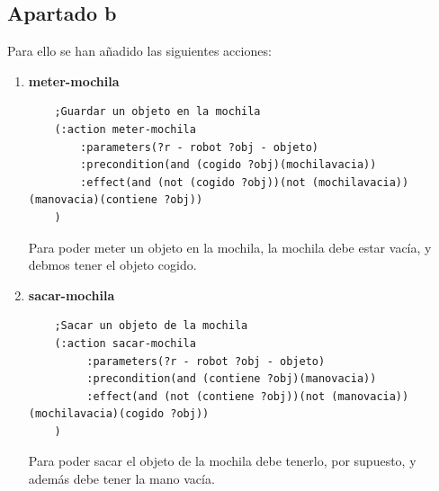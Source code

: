 \subsection{Apartado b}
Para ello se han añadido las siguientes acciones:
\begin{enumerate}
	\item \textbf{meter-mochila}
	\begin{verbatim}
	;Guardar un objeto en la mochila
	(:action meter-mochila
	    :parameters(?r - robot ?obj - objeto)
	    :precondition(and (cogido ?obj)(mochilavacia))
	    :effect(and (not (cogido ?obj))(not (mochilavacia))(manovacia)(contiene ?obj))
	)
	\end{verbatim}
	Para poder meter un objeto en la mochila, la mochila debe estar vacía, y debmos tener el objeto cogido.
	\item \textbf{sacar-mochila}
	\begin{verbatim}
	;Sacar un objeto de la mochila
	(:action sacar-mochila
	     :parameters(?r - robot ?obj - objeto)
	     :precondition(and (contiene ?obj)(manovacia))
	     :effect(and (not (contiene ?obj))(not (manovacia))(mochilavacia)(cogido ?obj))
	)
	\end{verbatim}
	Para poder sacar el objeto de la mochila debe tenerlo, por supuesto, y además debe tener la mano vacía.
\end{enumerate}
